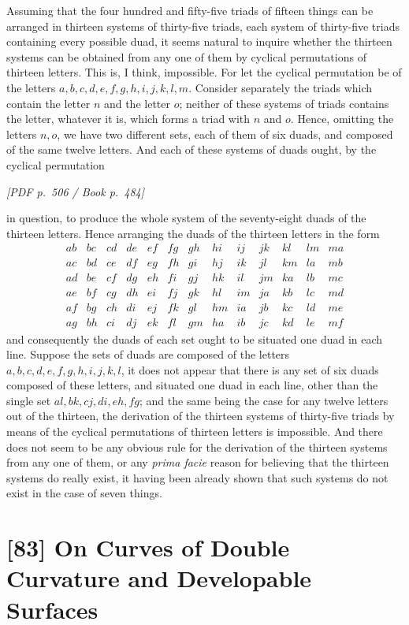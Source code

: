 \documentclass[11pt]{article}
\newcommand{\Page}[2]{\bigskip\noindent\textit{[PDF p.~#1 / Book p.~#2]}\par\smallskip}
\begin{document}
Assuming that the four hundred and fifty-five triads of fifteen things can be arranged
in thirteen systems of thirty-five triads, each system of thirty-five triads containing
every possible duad, it seems natural to inquire whether the thirteen systems can be
obtained from any one of them by cyclical permutations of thirteen letters. This is,
I think, impossible. For let the cyclical permutation be of the letters
$a,b,c,d,e,f,g,h,i,j,k,l,m$. Consider separately the triads which contain the letter
$n$ and the letter $o$; neither of these systems of triads contains the letter, whatever
it is, which forms a triad with $n$ and $o$. Hence, omitting the letters $n,o$, we
have two different sets, each of them of six duads, and composed of the same twelve
letters. And each of these systems of duads ought, by the cyclical permutation

\Page{506}{484}

\noindent in question, to produce the whole system of the seventy-eight duads of the thirteen
letters. Hence arranging the duads of the thirteen letters in the form
\[
\begin{array}{lllllllllllll}
ab&bc&cd&de&ef&fg&gh&hi&ij&jk&kl&lm&ma\\
ac&bd&ce&df&eg&fh&gi&hj&ik&jl&km&la&mb\\
ad&be&cf&dg&eh&fi&gj&hk&il&jm&ka&lb&mc\\
ae&bf&cg&dh&ei&fj&gk&hl&im&ja&kb&lc&md\\
af&bg&ch&di&ej&fk&gl&hm&ia&jb&kc&ld&me\\
ag&bh&ci&dj&ek&fl&gm&ha&ib&jc&kd&le&mf
\end{array}
\]
and consequently the duads of each set ought to be situated one duad in each line.
Suppose the sets of duads are composed of the letters $a,b,c,d,e,f,g,h,i,j,k,l$, it
does not appear that there is any set of six duads composed of these letters, and
situated one duad in each line, other than the single set $al,bk,cj,di,eh,fg$; and
the same being the case for any twelve letters out of the thirteen, the derivation of
the thirteen systems of thirty-five triads by means of the cyclical permutations of
thirteen letters is impossible. And there does not seem to be any obvious rule for
the derivation of the thirteen systems from any one of them, or any \textit{prima facie}
reason for believing that the thirteen systems do really exist, it having been already
shown that such systems do not exist in the case of seven things.

\section*{[83] On Curves of Double Curvature and Developable Surfaces}
\end{document}
